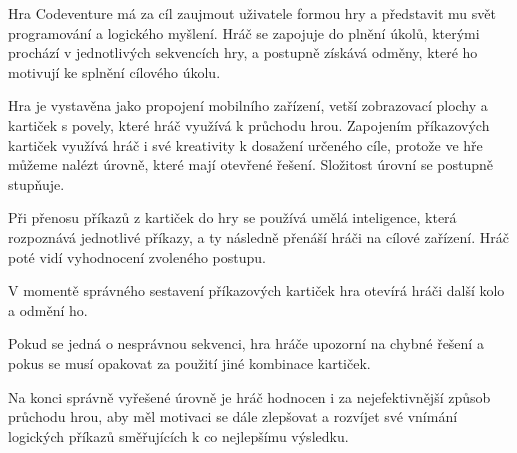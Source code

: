 Hra Codeventure má za cíl zaujmout uživatele formou hry a představit mu svět programování a logického myšlení. Hráč se zapojuje do plnění úkolů, kterými prochází v jednotlivých sekvencích hry, a postupně získává odměny, které ho motivují ke splnění cílového úkolu.\par
Hra je vystavěna jako propojení mobilního zařízení, vetší zobrazovací plochy a kartiček s povely, které hráč využívá k průchodu hrou. Zapojením příkazových kartiček využívá hráč i své kreativity k dosažení určeného cíle, protože ve hře můžeme nalézt úrovně, které mají otevřené řešení. Složitost úrovní se postupně stupňuje.\par
Při přenosu příkazů z kartiček do hry se používá umělá inteligence, která rozpoznává jednotlivé příkazy, a ty následně přenáší hráči na cílové zařízení. Hráč poté vidí vyhodnocení zvoleného postupu.\par
V momentě správného sestavení příkazových kartiček hra otevírá hráči další kolo a odmění ho.\par
Pokud se jedná o nesprávnou sekvenci, hra hráče upozorní na chybné řešení a pokus se musí opakovat za použití jiné kombinace kartiček.\par
Na konci správně vyřešené úrovně je hráč hodnocen i za nejefektivnější způsob průchodu hrou, aby měl motivaci se dále zlepšovat a rozvíjet své vnímání logických příkazů směřujících k co nejlepšímu výsledku.